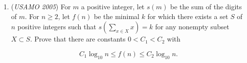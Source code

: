 \begin{enumerate}
 Prove that there exist at least two balancing lines.


 

	\item (\textit{USAMO 2005}) For $m$ a positive integer, let $s(m)$ be the sum of the digits of $m$. For $n\ge 2$, let $f(n)$ be the minimal $k$ for which there  exists a set $S$ of $n$ positive integers such that  $s\left(\sum_{x\in X} x\right) = k$ for any nonempty subset $X\subset S$.  Prove that there are constants $0 < C_1 < C_2$ with

 \[C_1 \log_{10} n \le f(n) \le C_2 \log_{10} n.\]


\end{enumerate}